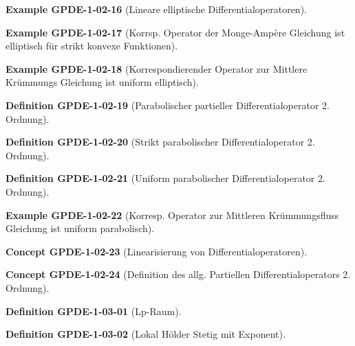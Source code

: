 \documentclass[10pt, letterpaper]{article}
\newcommand{\CustomHeading}[3]{%
  \par\medskip\noindent%
  \textbf{#1 #2} \textnormal{(#3)}.\enskip%
}
\newenvironment{DEF}[2]{\CustomHeading{Definition}{#1}{#2}}{}
\newenvironment{EXA}[2]{\CustomHeading{Example}{#1}{#2}}{}
\newenvironment{CONC}[2]{\CustomHeading{Concept}{#1}{#2}}{}
\begin{document}
\begin{EXA}{GPDE-1-02-16}{Lineare elliptische Differentialoperatoren}
\end{EXA}

\begin{EXA}{GPDE-1-02-17}{Korrsp. Operator der Monge-Ampère Gleichung ist elliptisch für strikt konvexe Funktionen}
\end{EXA}

\begin{EXA}{GPDE-1-02-18}{Korrespondierender Operator zur Mittlere Krümmungs Gleichung ist uniform elliptisch}
\end{EXA}

\begin{DEF}{GPDE-1-02-19}{Parabolischer partieller Differentialoperator 2. Ordnung}
\end{DEF}

\begin{DEF}{GPDE-1-02-20}{Strikt parabolischer Differentialoperator 2. Ordnung}
\end{DEF}

\begin{DEF}{GPDE-1-02-21}{Uniform parabolischer Differentialoperator 2. Ordnung}
\end{DEF}

\begin{EXA}{GPDE-1-02-22}{Korresp. Operator zur Mittleren Krümmungsfluss Gleichung ist uniform parabolisch}
\end{EXA}

\begin{CONC}{GPDE-1-02-23}{Linearisierung von Differentialoperatoren}
\end{CONC}

\begin{CONC}{GPDE-1-02-24}{Definition des allg. Partiellen Differentialoperators 2. Ordnung}
\end{CONC}

\begin{DEF}{GPDE-1-03-01}{Lp-Raum}
\end{DEF}

\begin{DEF}{GPDE-1-03-02}{Lokal Hölder Stetig mit Exponent}
\end{DEF}
\end{document}
